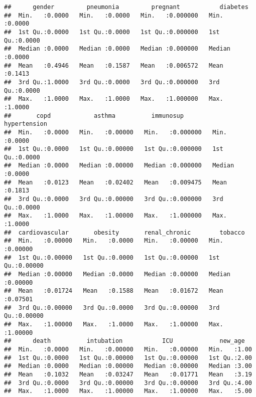 \documentclass[
]{article}
\begin{document}
\begin{verbatim}
##      gender         pneumonia         pregnant           diabetes     
##  Min.   :0.0000   Min.   :0.0000   Min.   :0.000000   Min.   :0.0000  
##  1st Qu.:0.0000   1st Qu.:0.0000   1st Qu.:0.000000   1st Qu.:0.0000  
##  Median :0.0000   Median :0.0000   Median :0.000000   Median :0.0000  
##  Mean   :0.4946   Mean   :0.1587   Mean   :0.006572   Mean   :0.1413  
##  3rd Qu.:1.0000   3rd Qu.:0.0000   3rd Qu.:0.000000   3rd Qu.:0.0000  
##  Max.   :1.0000   Max.   :1.0000   Max.   :1.000000   Max.   :1.0000  
##       copd            asthma          immunosup         hypertension   
##  Min.   :0.0000   Min.   :0.00000   Min.   :0.000000   Min.   :0.0000  
##  1st Qu.:0.0000   1st Qu.:0.00000   1st Qu.:0.000000   1st Qu.:0.0000  
##  Median :0.0000   Median :0.00000   Median :0.000000   Median :0.0000  
##  Mean   :0.0123   Mean   :0.02402   Mean   :0.009475   Mean   :0.1813  
##  3rd Qu.:0.0000   3rd Qu.:0.00000   3rd Qu.:0.000000   3rd Qu.:0.0000  
##  Max.   :1.0000   Max.   :1.00000   Max.   :1.000000   Max.   :1.0000  
##  cardiovascular       obesity       renal_chronic        tobacco       
##  Min.   :0.00000   Min.   :0.0000   Min.   :0.00000   Min.   :0.00000  
##  1st Qu.:0.00000   1st Qu.:0.0000   1st Qu.:0.00000   1st Qu.:0.00000  
##  Median :0.00000   Median :0.0000   Median :0.00000   Median :0.00000  
##  Mean   :0.01724   Mean   :0.1588   Mean   :0.01672   Mean   :0.07501  
##  3rd Qu.:0.00000   3rd Qu.:0.0000   3rd Qu.:0.00000   3rd Qu.:0.00000  
##  Max.   :1.00000   Max.   :1.0000   Max.   :1.00000   Max.   :1.00000  
##      death          intubation           ICU             new_age    
##  Min.   :0.0000   Min.   :0.00000   Min.   :0.00000   Min.   :1.00  
##  1st Qu.:0.0000   1st Qu.:0.00000   1st Qu.:0.00000   1st Qu.:2.00  
##  Median :0.0000   Median :0.00000   Median :0.00000   Median :3.00  
##  Mean   :0.1032   Mean   :0.03247   Mean   :0.01771   Mean   :3.19  
##  3rd Qu.:0.0000   3rd Qu.:0.00000   3rd Qu.:0.00000   3rd Qu.:4.00  
##  Max.   :1.0000   Max.   :1.00000   Max.   :1.00000   Max.   :5.00
\end{verbatim}
\end{document}
